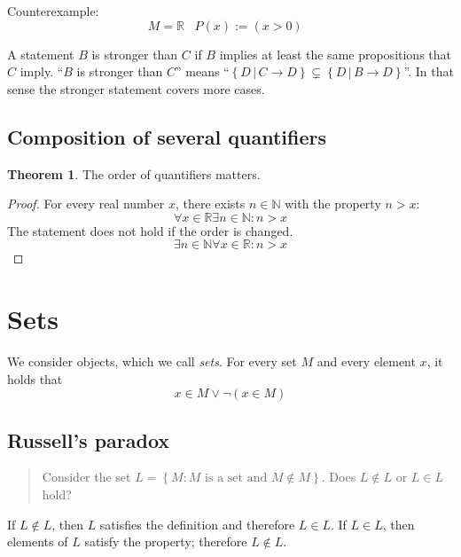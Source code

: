 \documentclass[a4paper,landscape,twocolumn]{article}
\theoremstyle{definition}
\newtheorem{theorem}{Theorem}
\newcommand\set[1]{\left\{#1\right\}}
\newcommand\setdef[2]{\left\{#1\,|\,#2\right\}}
\begin{document}

Counterexample:
\[ M = \mathbb{R} \hspace{10pt} P(x) := ( x > 0 ) \hspace{10pt} \]

A statement $B$ is stronger than $C$ if $B$ implies at least the same propositions that $C$ imply.
\enquote{$B$ is stronger than $C$} means \enquote{$\setdef{D}{C \rightarrow D} \subsetneq \setdef{D}{B \rightarrow D}$}.
In that sense the stronger statement covers more cases.

\subsection{Composition of several quantifiers}
%
\begin{theorem}
  The order of quantifiers matters.
\end{theorem}
\begin{proof}
  For every real number $x$, there exists $n \in \mathbb{N}$ with the property $n > x$:
  \[ \forall x \in \mathbb{R} \exists n \in \mathbb{N}: n > x \]
  The statement does not hold if the order is changed.
  \[ \exists n \in \mathbb{N} \forall x \in \mathbb{R}: n > x \]
\end{proof}

\section{Sets}
%
We consider objects, which we call \emph{sets}.
For every set $M$ and every element $x$, it holds that
\[ x \in M \lor \neg(x \in M) \]

\subsection{Russell's paradox}

\begin{quote}
  Consider the set $L = \set{M: M \text{ is a set and } M \not\in M}$.
  Does $L \not\in L$ or $L \in L$ hold?
\end{quote}

If $L \not\in L$, then $L$ satisfies the definition and therefore $L \in L$.
If $L \in L$, then elements of $L$ satisfy the property; therefore $L \not\in L$.
\end{document}

